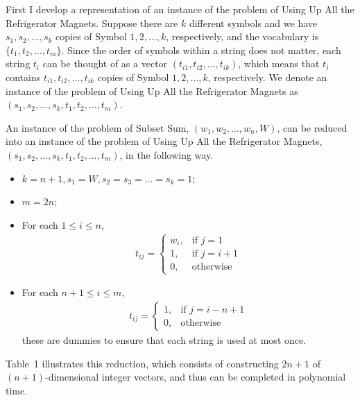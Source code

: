 \documentclass[12pt,letterpaper]{article}
\begin{document}
First I develop a representation of an instance of the problem of Using Up All the Refrigerator Magnets. Suppose there are $k$ different symbols and we have $s_1, s_2, \dots, s_k$ copies of Symbol $1, 2, \dots, k$, respectively, and the vocabulary is $\{t_1, t_2, \dots, t_m\}$. Since the order of symbols within a string does not matter, each string $t_i$ can be thought of as a vector $(t_{i1}, t_{i2}, \dots, t_{ik})$, which means that $t_i$ contains $t_{i1}, t_{i2}, \dots, t_{ik}$ copies of Symbol $1, 2, \dots, k$, respectively. We denote an instance of the problem of Using Up All the Refrigerator Magnets as $(s_1, s_2, \dots, s_k, t_1, t_2, \dots, t_m)$.

An instance of the problem of Subset Sum, $(w_1, w_2, \dots, w_n, W)$, can be reduced into an instance of the problem of Using Up All the Refrigerator Magnets, $(s_1, s_2, \dots, s_k, t_1, t_2, \dots, t_m)$, in the following way.
\begin{itemize}
\item $k=n+1, s_1=W, s_2=s_3=\dots=s_k=1$;
\item $m=2n$; 
\item For each $1\le i \le n$, 
\begin{align}
t_{ij}=\left\{\begin{array}{rl}
w_i, & \textrm{if } j=1\\
1, & \textrm{if } j=i+1\\
0, & \textrm{otherwise}
\end{array}\right.
\end{align}
\item For each $n+1\le i \le m$, 
\begin{align}
t_{ij}=\left\{\begin{array}{rl}
1, & \textrm{if } j=i-n+1\\
0, & \textrm{otherwise}
\end{array}\right.
\end{align}
these are dummies to ensure that each string is used at most once.
\end{itemize}
Table~1 illustrates this reduction, which consists of constructing $2n+1$ of $(n+1)$-dimensional integer vectors, and thus can be completed in polynomial time.
\end{document}
